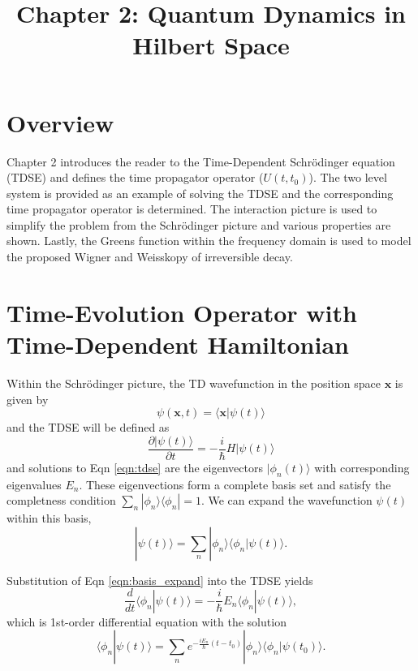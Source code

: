 \documentclass{article}
\title{Chapter 2: Quantum Dynamics in Hilbert Space} %
\begin{document}
\maketitle

\section{Overview}

Chapter 2 introduces the reader to the Time-Dependent Schr{\"o}dinger equation (TDSE)
and defines the time propagator operator ($U(t,t_0)$). The two level system is
provided as an example of solving the TDSE and the corresponding time propagator operator
is determined. The interaction picture is used to simplify the
problem from the Schr{\"o}dinger picture and various properties are shown. Lastly,
the Greens function within the frequency domain is used to model the proposed
Wigner and Weisskopy of irreversible decay.

\section{Time-Evolution Operator with Time-Dependent Hamiltonian}{\label{sec:setup}}

Within the Schr{\"o}dinger picture, the TD wavefunction in the position space $\mathbf{x}$
is given by
\begin{equation}
  \psi(\mathbf{x},t) = \langle \mathbf{x}|\psi(t)\rangle
\end{equation}
and the TDSE will be defined as
\begin{equation}
  \frac{\partial|\psi(t)\rangle}{\partial t} = -\frac{i}{\hbar}H|\psi(t)\rangle
  \label{eqn:tdse}
\end{equation}
and solutions to Eqn \eqref{eqn:tdse} are the eigenvectors $|\phi_n(t)\rangle$ with corresponding
eigenvalues $E_n$. These eigenvections form a complete basis set and satisfy the completness
condition $\sum_n|\phi_n\rangle\langle\phi_n|=1$. We can expand the wavefunction
$\psi(t)$ within this basis,
\begin{equation}
  |\psi(t)\rangle = \sum_n|\phi_n\rangle\langle\phi_n|\psi(t)\rangle.
  \label{eqn:basis_expand}
\end{equation}

Substitution of Eqn \eqref{eqn:basis_expand} into the TDSE yields
\begin{equation}
  \frac{d}{dt}\langle \phi_n|\psi(t)\rangle = -\frac{i}{\hbar}E_n\langle\phi_n|\psi(t)\rangle,
  \label{eqn:tdse_basis}
\end{equation}
which is 1st-order differential equation with the solution
\begin{equation}
  \langle\phi_n|\psi(t)\rangle = \sum_ne^{-\frac{iE_n}{\hbar}(t-t_0)}|\phi_n\rangle
  \langle\phi_n|\psi(t_0)\rangle.
  \label{eqn:time_soln}
\end{equation}
\end{document}
